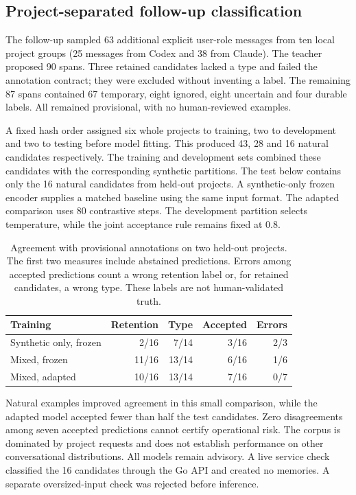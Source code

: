 \subsection{Project-separated follow-up classification}
The follow-up sampled 63 additional explicit user-role messages from ten local project groups (25 messages from Codex and 38 from Claude). The teacher proposed 90 spans. Three retained candidates lacked a type and failed the annotation contract; they were excluded without inventing a label. The remaining 87 spans contained 67 temporary, eight ignored, eight uncertain and four durable labels. All remained provisional, with no human-reviewed examples.

A fixed hash order assigned six whole projects to training, two to development and two to testing before model fitting. This produced 43, 28 and 16 natural candidates respectively. The training and development sets combined these candidates with the corresponding synthetic partitions. The test below contains only the 16 natural candidates from held-out projects. A synthetic-only frozen encoder supplies a matched baseline using the same input format. The adapted comparison uses 80 contrastive steps. The development partition selects temperature, while the joint acceptance rule remains fixed at 0.8.

\begin{table}[htbp]
\centering
\begin{tabular}{lrrrr}
\toprule
Training & Retention & Type & Accepted & Errors\\
\midrule
Synthetic only, frozen & 2/16 & 7/14 & 3/16 & 2/3\\
Mixed, frozen & 11/16 & 13/14 & 6/16 & 1/6\\
Mixed, adapted & 10/16 & 13/14 & 7/16 & 0/7\\
\bottomrule
\end{tabular}
\caption{Agreement with provisional annotations on two held-out projects. The first two measures include abstained predictions. Errors among accepted predictions count a wrong retention label or, for retained candidates, a wrong type. These labels are not human-validated truth.}
\label{tab:natural-followup}
\end{table}

Natural examples improved agreement in this small comparison, while the adapted model accepted fewer than half the test candidates. Zero disagreements among seven accepted predictions cannot certify operational risk. The corpus is dominated by project requests and does not establish performance on other conversational distributions. All models remain advisory. A live service check classified the 16 candidates through the Go API and created no memories. A separate oversized-input check was rejected before inference.

